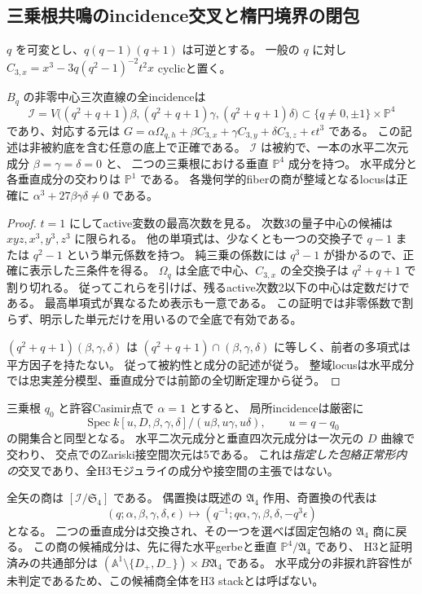 \subsection{三乗根共鳴のincidence交叉と楕円境界の閉包}
\label{subsec:quantum-triangle-incidence}
$q$ を可変とし、$q(q-1)(q+1)$ は可逆とする。
一般の $q$ に対し $C_{3,x}=x^3-3q(q^2-1)^{-2}t^2x$ cyclicと置く。

\begin{proposition}[全基底上の中心三次incidence]
\label{prop:quantum-triangle-resonance}
$B_q$ の非零中心三次直線の全incidenceは
\[
 \mathcal I=V\bigl((q^2+q+1)\beta,
 (q^2+q+1)\gamma,(q^2+q+1)\delta\bigr)
 \subset\{q\ne0,\pm1\}\times\mathbb P^4
\]
であり、対応する元は
$G=\alpha\Omega_{q,h}+\beta C_{3,x}+\gamma C_{3,y}+\delta C_{3,z}+\epsilon t^3$ である。
この記述は非被約底を含む任意の底上で正確である。
$\mathcal I$ は被約で、一本の水平二次元成分 $\beta=\gamma=\delta=0$ と、
二つの三乗根における垂直 $\mathbb P^4$ 成分を持つ。
水平成分と各垂直成分の交わりは $\mathbb P^1$ である。
各幾何学的fiberの商が整域となるlocusは正確に
$\alpha^3+27\beta\gamma\delta\ne0$ である。
\end{proposition}
\begin{proof}
$t=1$ にしてactive変数の最高次数を見る。
次数3の量子中心の候補は $xyz,x^3,y^3,z^3$ に限られる。
他の単項式は、少なくとも一つの交換子で $q-1$ または $q^2-1$ という単元係数を持つ。
純三乗の係数には $q^3-1$ が掛かるので、正確に表示した三条件を得る。
$\Omega_q$ は全底で中心、$C_{3,x}$ の全交換子は $q^2+q+1$ で割り切れる。
従ってこれらを引けば、残るactive次数2以下の中心は定数だけである。
最高単項式が異なるため表示も一意である。
この証明では非零係数で割らず、明示した単元だけを用いるので全底で有効である。

$(q^2+q+1)(\beta,\gamma,\delta)$ は
$(q^2+q+1)\cap(\beta,\gamma,\delta)$ に等しく、前者の多項式は平方因子を持たない。
従って被約性と成分の記述が従う。
整域locusは水平成分では忠実差分模型、垂直成分では前節の全切断定理から従う。
\end{proof}

三乗根 $q_0$ と許容Casimir点で $\alpha=1$ とすると、
局所incidenceは厳密に
\[
 \operatorname{Spec}k[u,D,\beta,\gamma,\delta]/
 (u\beta,u\gamma,u\delta),\qquad u=q-q_0
\]
の開集合と同型となる。
水平二次元成分と垂直四次元成分は一次元の $D$ 曲線で交わり、
交点でのZariski接空間次元は5である。
これは\emph{指定した包絡正常形内の}交叉であり、全H3モジュライの成分や接空間の主張ではない。

全矢の商は $[\mathcal I/\mathfrak S_4]$ である。
偶置換は既述の $\mathfrak A_4$ 作用、奇置換の代表は
\[
 (q;\alpha,\beta,\gamma,\delta,\epsilon)
 \longmapsto(q^{-1};q\alpha,\gamma,\beta,\delta,-q^3\epsilon)
\]
となる。
二つの垂直成分は交換され、その一つを選べば固定包絡の $\mathfrak A_4$ 商に戻る。
この商の候補成分は、先に得た水平gerbeと垂直 $\mathbb P^4/\mathfrak A_4$ であり、
H3と証明済みの共通部分は
$(\mathbb A^1\setminus\{D_+,D_-\})\times B\mathfrak A_4$ である。
水平成分の非捩れ許容性が未判定であるため、この候補商全体をH3 stackとは呼ばない。

